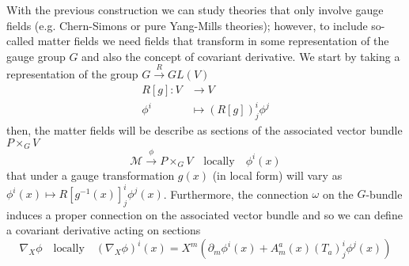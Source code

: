 \documentclass[a4paper,12pt]{article}
\numberwithin{equation}{section}
\numberwithin{thm}{section}
\numberwithin{exm}{section}
\newcommand{\M}{\mathcal M}
\newcommand{\p}{\partial}
\newcommand{\<}{{\langle}}
\renewcommand{\>}{{\rangle}}
\newcommand{\om}{{\omega}}
\begin{document}
With the previous construction we can study theories that only involve gauge fields (e.g. Chern-Simons or pure Yang-Mills theories); however, to include so-called matter fields we need fields that transform in some representation of the gauge group $G$ and also the concept of covariant derivative. We start by taking a representation of the group $G\overset{R}{\rightarrow} GL(V)$
	\begin{equation}
		\begin{aligned}
		R[g]: V & \rightarrow V \\
		\phi^i & \mapsto (R[g])^i_j\phi^j
		\end{aligned}
	\end{equation}
then, the matter fields will be describe as sections of the associated vector bundle $P\times_G V$
	\begin{equation}
	\M\overset{\phi}{\rightarrow}P\times_G V\quad\text{locally}\quad \phi^i(x)
	\end{equation}
that under a gauge transformation $g(x)$ (in local form) will vary as $\phi^i(x)\mapsto R[g^{-1}(x)]^i_j\phi^j(x)$. Furthermore, the connection $\om$ on the $G$-bundle induces a proper connection on the associated vector bundle and so we can define a covariant derivative acting on sections
	\begin{equation}
	\nabla_X\phi \quad\text{locally}\quad (\nabla_X \phi)^i(x) = X^m(\p_m\phi^i(x) + A^a_m(x)(T_a)^i_j\phi^j(x))
	\end{equation}
\end{document}
